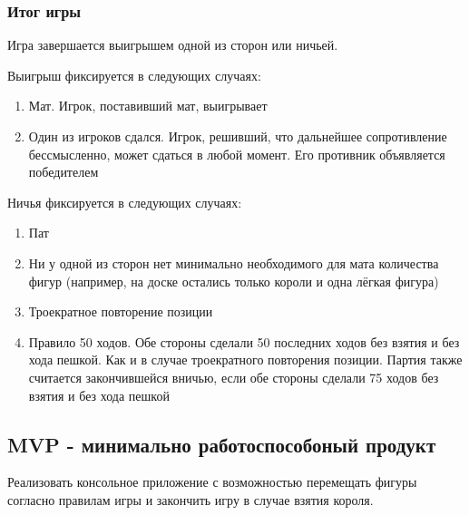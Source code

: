 \subsubsection*{Итог игры}
Игра завершается выигрышем одной из сторон или ничьей.

Выигрыш фиксируется в следующих случаях:
\begin{enumerate}
\item Мат. Игрок, поставивший мат, выигрывает\\
\item Один из игроков сдался. Игрок, решивший, что дальнейшее сопротивление бессмысленно, может сдаться в любой момент. Его противник объявляется победителем\\
\end{enumerate}

Ничья фиксируется в следующих случаях:
\begin{enumerate}
\item Пат\\
\item Ни у одной из сторон нет минимально необходимого для мата количества фигур (например, на доске остались только короли и одна лёгкая фигура)\\
\item Троекратное повторение позиции\\
\item Правило 50 ходов. Обе стороны сделали 50 последних ходов без взятия и без хода пешкой. Как и в случае троекратного повторения позиции. Партия также считается закончившейся вничью, если обе стороны сделали 75 ходов без взятия и без хода пешкой\\
\end{enumerate}

\subsection*{MVP - минимально работоспособоный продукт}
Реализовать консольное приложение с возможностью перемещать фигуры согласно правилам игры и закончить игру в случае взятия короля.

